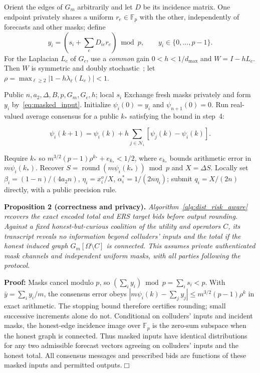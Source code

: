 \documentclass[journal]{IEEEtran}
\begin{document}
Orient the edges of $G_m$ arbitrarily and let $D$ be its incidence matrix. One endpoint privately shares a uniform $r_e\in\mathbb F_p$ with the other, independently of forecasts and other masks; define
\begin{equation}
 y_i=\left(s_i+\sum_e D_{ie}r_e\right)\bmod p,
 \qquad y_i\in\{0,\ldots,p-1\}. \label{eq:masked_input}
\end{equation}
For the Laplacian $L_c$ of $G_c$, use a \emph{common} gain $0<h<1/d_{\max}$ and $W=I-hL_c$. Then $W$ is symmetric and doubly stochastic~\cite{qu}; let $\rho=\max_{\ell\geq2}|1-h\lambda_\ell(L_c)|<1$.

\begin{algorithm}[hbt]
\caption{Masked Consensus for the Uncapped ERS Design}
\label{alg:dist_risk_aware}
\begin{algorithmic}[1]
\Require Public $n,a_2,\Delta,B,p,G_m,G_c,h$; local $s_i$
\State Exchange fresh masks privately and form $y_i$ by~\eqref{eq:masked_input}.
\State Initialize $\psi_i(0)=y_i$ and $\psi_{n+1}(0)=0$.
\State Run real-valued average consensus for a public $k_*$ satisfying the bound in step~4:
\end{algorithmic}
\begin{equation}
 \psi_i(k+1)=\psi_i(k)+h\sum_{j\in\mathcal N_i}
 [\psi_j(k)-\psi_i(k)]. \label{eq:psi}
\end{equation}
\begin{algorithmic}[1]
\setcounter{ALG@line}{3}
\State Require $k_*$ so $m^{3/2}(p-1)\rho^{k_*}+e_{k_*}<1/2$, where $e_{k_*}$ bounds arithmetic error in $m\psi_i(k_*)$.
\State Recover $S=\operatorname{round}(m\psi_i(k_*))\bmod p$ and $X=\Delta S$.
\State Locally set $\beta_i=(1-n)/(4a_2n)$, $\eta_i=x_i^o/X$, $\alpha_i^*=1/(2n\eta_i)$; submit $q_i=X/(2n)$ directly, with a public precision rule.
\end{algorithmic}
\end{algorithm}

\noindent\textbf{Proposition 2 (correctness and privacy).}
\textit{Algorithm~\ref{alg:dist_risk_aware} recovers the exact encoded total and ERS target bids before output rounding. Against a fixed honest-but-curious coalition of the utility and operators $C$, its transcript reveals no information beyond colluders' inputs and the total if the honest induced graph $G_m[\Omega\setminus C]$ is connected. This assumes private authenticated mask channels and independent uniform masks, with all parties following the protocol.}

\noindent\textbf{Proof:} Masks cancel modulo $p$, so $(\sum_i y_i)\bmod p=\sum_i s_i<p$. With $\bar y=\sum_i y_i/m$, the consensus error obeys $|m\psi_i(k)-\sum_jy_j|\leq m^{3/2}(p-1)\rho^k$ in exact arithmetic. The stopping bound therefore certifies rounding; small successive increments alone do not. Conditional on colluders' inputs and incident masks, the honest-edge incidence image over $\mathbb F_p$ is the zero-sum subspace when the honest graph is connected. Thus masked inputs have identical distributions for any two admissible forecast vectors agreeing on colluders' inputs and the honest total. All consensus messages and prescribed bids are functions of these masked inputs and permitted outputs.\hfill$\Box$
\end{document}
